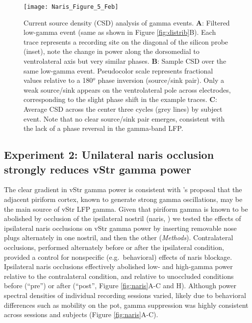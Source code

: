 \documentclass[11pt]{article}
\makeatletter
\newcommand{\bsf}[1]{\textbf{#1}}
\newcommand{\degree}{$^o$\@\xspace}
\let\citeN=\citet
\let\citeNP=\citealt
\makeatother
\begin{document}
\begin{figure}[h]
\centering
\texttt{[image: Naris\_Figure\_5\_Feb]}
\caption{Current source density (CSD) analysis of gamma
  events. \bsf{A}: Filtered low-gamma event (same as shown in Figure
  \ref{fig:distrib}B). Each trace represents a recording site on the
  diagonal of the silicon probe (inset), note the change in power
  along the dorsomedial to ventrolateral axis but very similar
  phases. \bsf{B}: Sample CSD over the same low-gamma
  event. Pseudocolor scale represents fractional values relative to a
  180\degree phase inversion (source/sink pair). Only a weak
  source/sink appears on the ventrolateral pole across electrodes,
  corresponding to the slight phase shift in the example
  traces. \bsf{C}: Average CSD across the center three cycles (grey
  lines) by subject event. Note that no clear source/sink pair
  emerges, consistent with the lack of a phase reversal in the
  gamma-band LFP.}
\label{fig:csd}
\end{figure}

\subsection*{Experiment 2: Unilateral naris occlusion strongly reduces vStr gamma
  power}
  
The clear gradient in vStr gamma power is consistent with
\citeN{Berke2009b}'s proposal that the adjacent piriform cortex, known
to generate strong gamma oscillations, may be the main source of vStr
LFP gamma. Given that piriform gamma is known to be abolished by
occlusion of the ipsilateral nostril (naris, \citeNP{Zibrowski1997})
we tested the effects of ipsilateral naris occlusions on vStr gamma
power by inserting removable nose plugs alternately in one nostril,
and then the other ({\it Methods}). Contralateral occlusions,
performed alternately before or after the ipsilateral condition,
provided a control for nonspecific (e.g.\ behavioral) effects of naris
blockage. Ipsilateral naris occlusions effectively abolished low- and
high-gamma power relative to the contralateral condition, and relative
to unoccluded conditions before (``pre'') or after (``post'', Figure
\ref{fig:naris}A-C and H). Although power spectral densities of
individual recording sessions varied, likely due to behavioral
differences such as mobility on the pot, gamma suppression was highly
consistent across sessions and subjects (Figure \ref{fig:naris}A-C).
\end{document}
